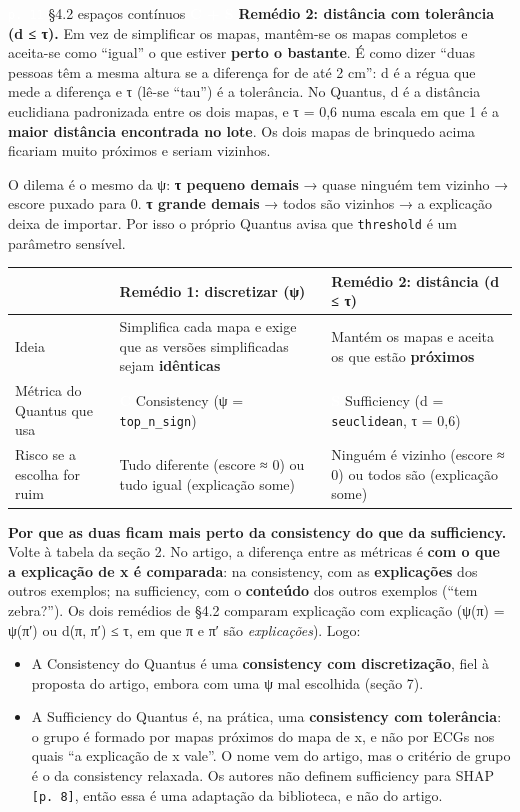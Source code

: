 \documentclass[11pt,a4paper]{article}
\newcommand{\metrictag}[2]{{\setlength{\fboxsep}{1.5pt}%
  \ifstrequal{#1}{c}{\colorbox{cC}{\textcolor{white}{\scriptsize\textbf{#2}}}}{%
  \ifstrequal{#1}{s}{\colorbox{cS}{\textcolor{white}{\scriptsize\textbf{#2}}}}{%
  \colorbox{black!60}{\textcolor{white}{\scriptsize\textbf{#2}}}}}}}
\newcommand{\pagechip}[1]{{\setlength{\fboxsep}{1.5pt}\colorbox{cAcc}{\textcolor{white}{\scriptsize\texttt{#1}}}}}
\begin{document}
\begin{citacard}{\pagechip{p. 11} §4.2 espaços contínuos \metrictag{cs}{C + S}}
\textbf{Remédio 2: distância com tolerância (d ≤ τ).} Em vez de simplificar os mapas, mantêm-se os mapas completos e aceita-se como “igual” o que estiver \textbf{perto o bastante}. É como dizer “duas pessoas têm a mesma altura se a diferença for de até 2 cm”: d é a régua que mede a diferença e τ (lê-se “tau”) é a tolerância. No Quantus, d é a distância euclidiana padronizada entre os dois mapas, e τ = 0,6 numa escala em que 1 é a \textbf{maior distância encontrada no lote}. Os dois mapas de brinquedo acima ficariam muito próximos e seriam vizinhos.

O dilema é o mesmo da ψ: \textbf{τ pequeno demais} → quase ninguém tem vizinho → escore puxado para 0. \textbf{τ grande demais} → todos são vizinhos → a explicação deixa de importar. Por isso o próprio Quantus avisa que \texttt{threshold} é um parâmetro sensível.

\begin{center}\small
\begin{tabularx}{\linewidth}{lXX}
\toprule
 & \textbf{Remédio 1: discretizar (ψ)} & \textbf{Remédio 2: distância (d ≤ τ)} \\
\midrule
Ideia & Simplifica cada mapa e exige que as versões simplificadas sejam \textbf{idênticas} & Mantém os mapas e aceita os que estão \textbf{próximos} \\
Métrica do Quantus que usa & \metrictag{c}{C} Consistency (ψ = \texttt{top\_n\_sign}) & \metrictag{s}{S} Sufficiency (d = \texttt{seuclidean}, τ = 0,6) \\
Risco se a escolha for ruim & Tudo diferente (escore ≈ 0) ou tudo igual (explicação some) & Ninguém é vizinho (escore ≈ 0) ou todos são (explicação some) \\
\bottomrule
\end{tabularx}
\end{center}

\textbf{Por que as duas ficam mais perto da consistency do que da sufficiency.} Volte à tabela da seção 2. No artigo, a diferença entre as métricas é \textbf{com o que a explicação de x é comparada}: na consistency, com as \textbf{explicações} dos outros exemplos; na sufficiency, com o \textbf{conteúdo} dos outros exemplos (“tem zebra?”). Os dois remédios de §4.2 comparam explicação com explicação (ψ(π) = ψ(π′) ou d(π, π′) ≤ τ, em que π e π′ são \textit{explicações}). Logo:

\begin{itemize}
\item A Consistency do Quantus é uma \textbf{consistency com discretização}, fiel à proposta do artigo, embora com uma ψ mal escolhida (seção 7).
\item A Sufficiency do Quantus é, na prática, uma \textbf{consistency com tolerância}: o grupo é formado por mapas próximos do mapa de x, e não por ECGs nos quais “a explicação de x vale”. O nome vem do artigo, mas o critério de grupo é o da consistency relaxada. Os autores não definem sufficiency para SHAP \texttt{[p. 8]}, então essa é uma adaptação da biblioteca, e não do artigo.
\end{itemize}


\end{citacard}
\end{document}
